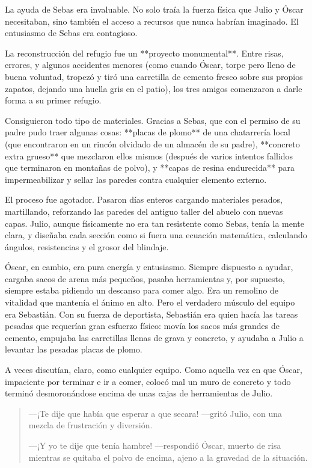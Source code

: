 \documentclass[a4paper,12pt]{book}
\begin{document}
La ayuda de Sebas era invaluable. No solo traía la fuerza física que Julio y Óscar necesitaban, sino también el acceso a recursos que nunca habrían imaginado. El entusiasmo de Sebas era contagioso.

La reconstrucción del refugio fue un **proyecto monumental**. Entre risas, errores, y algunos accidentes menores (como cuando Óscar, torpe pero lleno de buena voluntad, tropezó y tiró una carretilla de cemento fresco sobre sus propios zapatos, dejando una huella gris en el patio), los tres amigos comenzaron a darle forma a su primer refugio.

Consiguieron todo tipo de materiales. Gracias a Sebas, que con el permiso de su padre pudo traer algunas cosas: **placas de plomo** de una chatarrería local (que encontraron en un rincón olvidado de un almacén de su padre), **concreto extra grueso** que mezclaron ellos mismos (después de varios intentos fallidos que terminaron en montañas de polvo), y **capas de resina endurecida** para impermeabilizar y sellar las paredes contra cualquier elemento externo.

El proceso fue agotador. Pasaron días enteros cargando materiales pesados, martillando, reforzando las paredes del antiguo taller del abuelo con nuevas capas. Julio, aunque físicamente no era tan resistente como Sebas, tenía la mente clara, y diseñaba cada sección como si fuera una ecuación matemática, calculando ángulos, resistencias y el grosor del blindaje.

Óscar, en cambio, era pura energía y entusiasmo. Siempre dispuesto a ayudar, cargaba sacos de arena más pequeños, pasaba herramientas y, por supuesto, siempre estaba pidiendo un descanso para comer algo. Era un remolino de vitalidad que mantenía el ánimo en alto. Pero el verdadero músculo del equipo era Sebastián. Con su fuerza de deportista, Sebastián era quien hacía las tareas pesadas que requerían gran esfuerzo físico: movía los sacos más grandes de cemento, empujaba las carretillas llenas de grava y concreto, y ayudaba a Julio a levantar las pesadas placas de plomo.

A veces discutían, claro, como cualquier equipo. Como aquella vez en que Óscar, impaciente por terminar e ir a comer, colocó mal un muro de concreto y todo terminó desmoronándose encima de unas cajas de herramientas de Julio.

\begin{quote}
    —¡Te dije que había que esperar a que secara! —gritó Julio, con una mezcla de frustración y diversión.

    —¡Y yo te dije que tenía hambre! —respondió Óscar, muerto de risa mientras se quitaba el polvo de encima, ajeno a la gravedad de la situación.
\end{quote}
\end{document}
